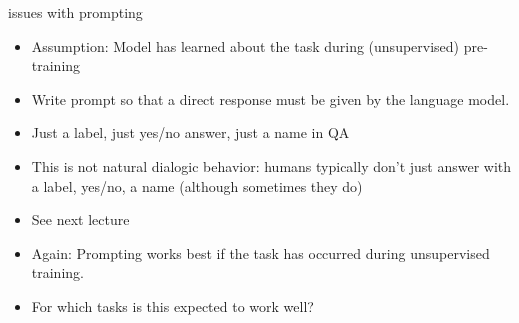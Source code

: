 \begin{frame}{issues with prompting}

\vfill

\begin{itemize}
    \item Assumption: Model has learned about the task during (unsupervised) pre-training 
    \item Write prompt so that  a direct response must be
    given by the language model.
        \item Just a label, just yes/no answer, just a name
    in QA
    \item This is not natural dialogic behavior: humans
    typically don't
    just answer with a label, yes/no, a name (although
    sometimes they do)
    \item See next lecture
\item Again: Prompting works best if the task has occurred during
unsupervised training.
    \item \ques For which tasks is this expected to work well?

\end{itemize}

\vfill

\end{frame}

%
%
%
%
%

